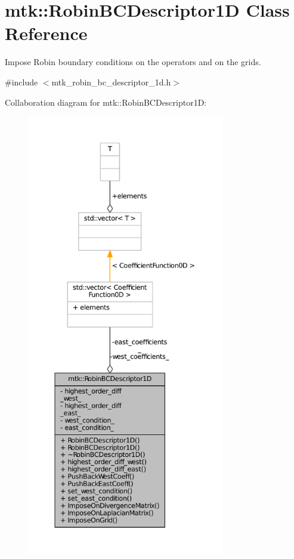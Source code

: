 \hypertarget{classmtk_1_1RobinBCDescriptor1D}{\section{mtk\+:\+:Robin\+B\+C\+Descriptor1\+D Class Reference}
\label{classmtk_1_1RobinBCDescriptor1D}
}


Impose Robin boundary conditions on the operators and on the grids.  




{\ttfamily \#include $<$mtk\+\_\+robin\+\_\+bc\+\_\+descriptor\+\_\+1d.\+h$>$}



Collaboration diagram for mtk\+:\+:Robin\+B\+C\+Descriptor1\+D\+:
\nopagebreak
\begin{figure}[H]
\begin{center}
\leavevmode
\includegraphics[height=550pt]{classmtk_1_1RobinBCDescriptor1D__coll__graph}
\end{center}
\end{figure}
